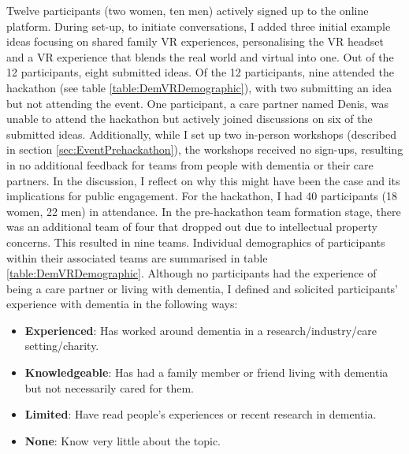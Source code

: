 Twelve participants (two women, ten men) actively signed up to the online platform. During set-up, to initiate conversations, I added three initial example ideas focusing on shared family VR experiences, personalising the VR headset and a VR experience that blends the real world and virtual into one. Out of the 12 participants, eight submitted ideas. Of the 12 participants, nine attended the hackathon (see table \ref{table:DemVRDemographic}), with two submitting an idea but not attending the event. One participant, a care partner named Denis, was unable to attend the hackathon but actively joined discussions on six of the submitted ideas. Additionally, while I set up two in-person workshops (described in section \ref{sec:EventPrehackathon}), the workshops received no sign-ups, resulting in no additional feedback for teams from people with dementia or their care partners. In the discussion, I reflect on why this might have been the case and its implications for public engagement.
For the hackathon, I had 40 participants (18 women, 22 men) in attendance. In the pre-hackathon team formation stage, there was an additional team of four that dropped out due to intellectual property concerns. This resulted in nine teams. Individual demographics of participants within their associated teams are summarised in table \ref{table:DemVRDemographic}. Although no participants had the experience of being a care partner or living with dementia, I defined and solicited participants’ experience with dementia in the following ways:

\begin{itemize}
\item{\textbf{Experienced}: Has worked around dementia in a research/industry/care setting/charity.}
\item{\textbf{Knowledgeable}: Has had a family member or friend living with dementia but not necessarily cared for them.}
\item{\textbf{Limited}: Have read people’s experiences or recent research in dementia.}
\item{\textbf{None}: Know very little about the topic.}
\end{itemize}



